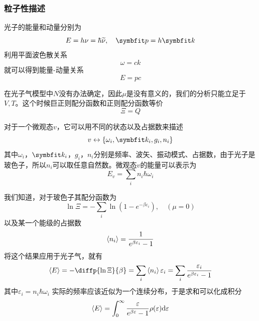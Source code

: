 \subsubsection{粒子性描述}

光子的能量和动量分别为 \begin{equation}
    E=h\nu=\hbar \widetilde{\nu}, \quad \bd{p}=h\bd{k}
\end{equation}
利用平面波色散关系\begin{equation}
    \omega=ck
\end{equation}
就可以得到能量-动量关系\begin{equation}
    E=pc
\end{equation}

在光子气模型中$N$没有办法确定，因此$\mu$是没有意义的，我们的分析只能立足于$V,T$。这个时候巨正则配分函数和正则配分函数等价\begin{equation}
    \Xi =Q
\end{equation}

对于一个微观态$v$，它可以用不同的状态以及占据数来描述\begin{equation}
    v\leftrightarrow \{\omega_i , \bd{k}_i, g_i, n_i\}
\end{equation}
其中$\omega_i$，$\bd{k}_i$，$g_i$，$n_i$分别是频率、波矢、振动模式、占据数，由于光子是玻色子，所以$n_i$可以取任意自然数。微观态$v$的能量可以表示为\begin{equation}
    E_v=\sum_i n_i \hbar\omega_i
\end{equation}

我们知道，对于玻色子其配分函数为\begin{equation}
    \ln \Xi =-\sum_i \ln (1-e^{-\beta \varepsilon_i}),\quad (\mu=0)
\end{equation}
以及某一个能级的占据数\begin{equation}
    \braket{n_i}=\frac{1}{e^{\beta\varepsilon_i}-1}
\end{equation}
将这个结果应用于光子气，就有\begin{equation}
    \braket{E} =-\diffp{\ln \Xi}{\beta} =\sum_i \braket{n_i} \varepsilon_i=\sum_i \frac{\varepsilon_i}{e^{\beta\varepsilon_i}-1}
\end{equation}
其中$\varepsilon_i =n_i\hbar\omega_i$
实际的频率应该近似为一个连续分布，于是求和可以化成积分\begin{equation}
    \braket{E} =\int_0^\infty \frac{\varepsilon}{e^{\beta\varepsilon}-1} \rho(\varepsilon)\mathrm{d}\varepsilon
\end{equation}

